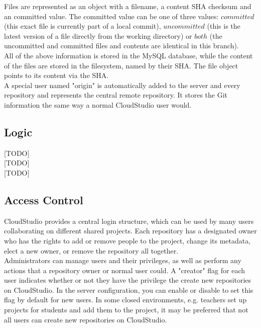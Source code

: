 Files are represented as an object with a filename, a content SHA checksum and an committed value. The committed value can be one of three values: $committed$ (this exact file is currently part of a local commit), $uncommitted$ (this is the latest version of a file directly from the working directory) or $both$ (the uncommitted and committed files and contents are identical in this branch). \\

All of the above information is stored in the MySQL database, while the content of the files are stored in the filesystem, named by their SHA. The file object points to its content via the SHA. \\

A special user named "origin" is automatically added to the server and every repository and represents the central remote repository. It stores the Git information the same way a normal CloudStudio user would.

\subsection{Logic}

[TODO] \\

[TODO] \\

[TODO]

\subsection{Access Control}

CloudStudio provides a central login structure, which can be used by many users collaborating on different shared projects. Each repository has a designated owner who has the rights to add or remove people to the project, change its metadata, elect a new owner, or remove the repository all together. \\

Administrators can manage users and their privileges, as well as perform any actions that a repository owner or normal user could. A "creator" flag for each user indicates whether or not they have the privilege the create new repositories on CloudStudio. In the server configuration, you can enable or disable to set this flag by default for new users. In some closed environments, e.g. teachers set up projects for students and add them to the project, it may be preferred that not all users can create new repositories on CloudStudio.


